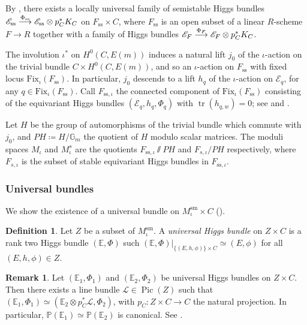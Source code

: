 \documentclass[JEP,XML,SOM,Unicode, NoEqCountersInSection,NoFloatCountersInSection,published]{cedram}
\let\mathcal\mathscr
\newcommand{\To}[1]{\mathchoice{\xrightarrow{\textstyle\kern4pt#1\kern3pt}}{\stackrel{#1}{\longrightarrow}}{}{}}
\newcommand{\PH}{\mathit{PH}}
\theoremstyle{definition}
\newtheorem{defn}[thm]{Definition}
\newtheorem{rmk}[thm]{Remark}
\newcommand{\Gm}{\mathbb{G}_m}
\newcommand{\PP}{\mathbb{P}}
\newcommand{\Tr}{\operatorname{tr}}
\newcommand{\Pic}{\operatorname{Pic}}
\begin{document}
By \cite[Prop.\,3.6]{Nitsure91}, there exists a locally universal family of semistable Higgs bundles $\mathcal{E}_\mathrm{ss} \To{\Phi_\mathrm{ss}} \mathcal{E}_\mathrm{ss} \otimes p_C^*K_C$ on $F_\mathrm{ss} \times C$, where $F_\mathrm{ss}$ is an open subset of a linear $R$-scheme $F \to R$ together with a family of Higgs bundles $\mathcal{E}_F \To{\Phi_F} \mathcal{E}_F \otimes p_C^*K_C$.

The involution $\iota^*$ on $H^0(C, E(m))$ induces a natural lift $j_0$ of the $\iota$-action on the trivial bundle $C \times H^0(C, E(m))$, and so an $\iota$-action on $F_\mathrm{ss}$ with fixed locus $\mathrm{Fix}_{\iota}(F_\mathrm{ss})$. In particular, $j_0$ descends to a lift $h_q$ of the $\iota$-action on $\mathcal{E}_q$, for any $q \in \mathrm{Fix}_{\iota}(F_\mathrm{ss})$. Call $F_{\mathrm{ss}, \iota}$ the connected component of $\mathrm{Fix}_{\iota}(F_\mathrm{ss})$ consisting of the equivariant Higgs bundles $(\mathcal{E}_q,h_q, \Phi_q)$ with $\Tr(h_{q, w})=0$; see \cite[Chap.\,II, Prop.\,6(iv)]{Seshadri70} and \cite[Chap.\,II, Prop.\,5 \& Rem.\,2]{Seshadri70}.

Let $H$ be the group of automorphisms of the trivial bundle which commute with~$j_0$, and $\PH\coloneqq H/\Gm$ the quotient of $H$ modulo scalar matrices. The moduli spaces $M_{\iota}$ and $M_{\iota}^s$ are the quotients $F_{\mathrm{ss}, \iota}\sslash \PH$ and $F_{s, \iota}/\PH$ respectively, where $F_{s, \iota}$ is the subset of stable equivariant Higgs bundles in $F_{\mathrm{ss}, \iota}$.

\subsubsection{Universal bundles}\label{sec:Universalbundle}
We show the existence of a universal bundle on $M^{\mathrm{sm}}_{\iota} \times C$ (\cf \cite[\S 5]{Hausel98}).

\begin{defn}
Let $Z$ be a subset of $M^{\mathrm{sm}}_{\iota}$. A \emph{universal Higgs bundle} on $Z \times C$ is a rank two Higgs bundle $(\mathbb{E}, \Phi)$ such
$(\mathbb{E}, \Phi)|_{\{(E, h, \phi)\}\times C}\simeq (E, \phi)$ for all $(E, h, \phi)\in Z$.
\end{defn}

\begin{rmk}\label{rmk:tensorization}
Let $(\mathbb{E}_1, \Phi_1)$ and $(\mathbb{E}_2, \Phi_2)$ be universal Higgs bundles on $Z \times C$. Then there exists a line bundle $\mathcal{L} \in \Pic(Z)$ such that $(\mathbb{E}_1, \Phi_1) \simeq (\mathbb{E}_2 \otimes p_C^*\mathcal{L}, \Phi_2)$, with $p_C\colon Z \times C \to C$ the natural projection. In particular, $\mathbb{P}(\mathbb{E}_1)\simeq \PP(\mathbb{E}_2)$ is canonical. See \cite[4.2]{HauselThaddeus04}.
\end{rmk}
\end{document}
